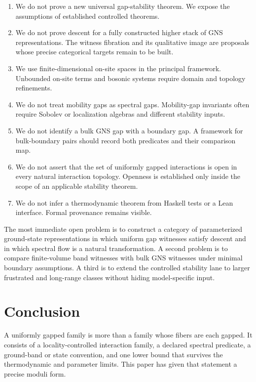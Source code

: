 \documentclass[12pt]{article}
\theoremstyle{definition}
\theoremstyle{remark}
\begin{document}
\begin{enumerate}[label=\arabic*.]
  \item We do not prove a new universal gap-stability theorem. We expose the
  assumptions of established controlled theorems.

  \item We do not prove descent for a fully constructed higher stack of GNS
  representations. The witness fibration and its qualitative image are
  proposals whose precise categorical targets remain to be built.

  \item We use finite-dimensional on-site spaces in the principal framework.
  Unbounded on-site terms and bosonic systems require domain and topology
  refinements.

  \item We do not treat mobility gaps as spectral gaps. Mobility-gap invariants
  often require Sobolev or localization algebras and different stability
  inputs.

  \item We do not identify a bulk GNS gap with a boundary gap. A framework for
  bulk-boundary pairs should record both predicates and their comparison map.

  \item We do not assert that the set of uniformly gapped interactions is open
  in every natural interaction topology. Openness is established only inside
  the scope of an applicable stability theorem.

  \item We do not infer a thermodynamic theorem from Haskell tests or a Lean
  interface. Formal provenance remains visible.
\end{enumerate}

The most immediate open problem is to construct a category of parameterized
ground-state representations in which uniform gap witnesses satisfy descent
and in which spectral flow is a natural transformation. A second problem is
to compare finite-volume band witnesses with bulk GNS witnesses under minimal
boundary assumptions. A third is to extend the controlled stability lane to
larger frustrated and long-range classes without hiding model-specific input.

\section{Conclusion}

A uniformly gapped family is more than a family whose fibers are each gapped.
It consists of a locality-controlled interaction family, a declared spectral
predicate, a ground-band or state convention, and one lower bound that survives
the thermodynamic and parameter limits. This paper has given that statement a
precise moduli form.
\end{document}
